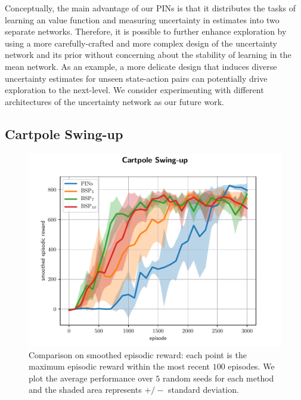 \documentclass[letterpaper]{article} %
\theoremstyle{definition}
\begin{document}
Conceptually, the main advantage of our PINs is that it distributes the tasks of learning an value function and measuring uncertainty in estimates into two separate networks. Therefore, it is possible to further enhance exploration by using a more carefully-crafted and more complex design of the uncertainty network and its prior without concerning about the stability of learning in the mean network. As an example, a more delicate design that induces diverse uncertainty estimates for unseen state-action pairs can potentially drive exploration to the next-level. We consider experimenting with different architectures of the uncertainty network as our future work.

\vspace{-3.21mm}
\subsection{Cartpole Swing-up}
\vspace{-3.81mm}
\begin{figure}[ht]
\centering
\includegraphics[width=1.0\linewidth]{cartpole_std_plot.pdf}
\caption{Comparison on smoothed episodic reward: each point is the maximum episodic reward within the most recent $100$ episodes. We plot the average performance over $5$ random seeds for each method and the shaded area represents $+/-$ standard deviation.}
\label{fig:cartpole_per}
\end{figure}
\end{document}
